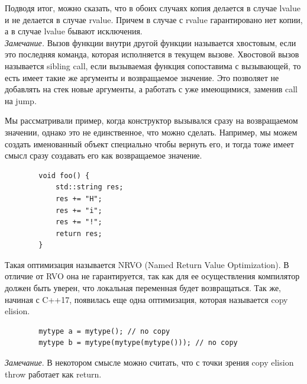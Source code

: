 \documentclass[12pt, a4paper]{article}
\begin{document}
	Подводя итог, можно сказать, что в обоих случаях копия делается в случае lvalue и не делается в случае rvalue. Причем в случае с rvalue гарантировано нет копии, а в случае lvalue бывают исключения.\\
	\textit{Замечание.} Вызов функции внутри другой функции называется хвостовым, если это последняя команда, которая исполняется в текущем вызове. Хвостовой вызов называется sibling call, если вызываемая функция сопоставима с вызывающей, то есть имеет такие же аргументы и возвращаемое значение. Это позволяет не добавлять на стек новые аргументы, а работать с уже имеющимися, заменив call на jump.\\
	\par Мы рассматривали пример, когда конструктор вызывался сразу на возвращаемом значении, однако это не единственное, что можно сделать. Например, мы можем создать именованный объект специально чтобы вернуть его, и тогда тоже имеет смысл сразу создавать его как возвращаемое значение.
	\begin{verbatim}
		void foo() {
			std::string res;
			res += "H";
			res += "i";
			res += "!";
			return res;
		}
	\end{verbatim}
	Такая оптимизация называется NRVO (Named Return Value Optimization). В отличие от RVO она не гарантируется, так как для ее осуществления компилятор должен быть уверен, что локальная переменная будет возвращаться. Так же, начиная с C++17, появилась еще одна оптимизация, которая называется copy elision.
	\begin{verbatim}
		mytype a = mytype(); // no copy
		mytype b = mytype(mytype(mytype())); // no copy
	\end{verbatim}
	\textit{Замечание}. В некотором смысле можно считать, что с точки зрения copy elision throw работает как return.
\end{document}
